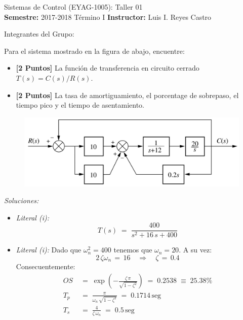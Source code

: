 \documentclass[ a4paper, twoside, 11pt]{article}
\newcommand{\numero}{01}
\begin{document}
\allowdisplaybreaks

\begin{center}
\Large Sistemas de Control (EYAG-1005): Taller \numero \\[1ex]
\small \textbf{Semestre:} 2017-2018 T\'ermino I \qquad
\textbf{Instructor:} Luis I. Reyes Castro
\end{center}
\halfskip

Integrantes del Grupo:
\fullskip
\fullskip
\fullskip

\begin{problem}
Para el sistema mostrado en la figura de abajo, encuentre: 
\begin{itemize}
\item \textbf{[2 Puntos]} La funci\'on de transferencia en circuito cerrado $T(s) = C(s) / R(s)$. 
\item \textbf{[2 Puntos]} La tasa de amortiguamiento, el porcentage de sobrepaso, el tiempo pico y el tiempo de asentamiento. 
\end{itemize}

\begin{figure}[htb]
\centering
\includegraphics[width=0.64\columnwidth]{Nise_Prob-5-17.jpg}
\end{figure}

\emph{Soluciones:}
\begin{itemize}
\item \emph{Literal (i):}
\[
T(s) \; = \; \frac{400}{ s^2 + 16 \, s + 400 }
\]
\item \emph{Literal (i):} Dado que $\omega_n^2 = 400$ tenemos que $\omega_n = 20$. A su vez: 
\[
2 \, \zeta \omega_n \, = \, 16 \quad \Longrightarrow \quad \zeta \, = \, 0.4
\]
Consecuentemente:
\begin{align*}
OS \; 
& = \; \exp \left( -\frac{\zeta \, \pi}{\sqrt{1 - \zeta^2}} \right) \; = \; 0.2538 \; \equiv \; 25.38\% \\[1ex]
T_p \; 
& = \; \frac{\pi}{ \omega_n \, \sqrt{1 - \zeta^2}} \; = \; 0.1714 \, \text{seg} \\[1ex]
T_s \; 
& = \; \frac{4}{\zeta \, \omega_n} \; = \; 0.5 \, \text{seg}
\end{align*}
\end{itemize}

\end{problem}
\fullskip
\end{document}
